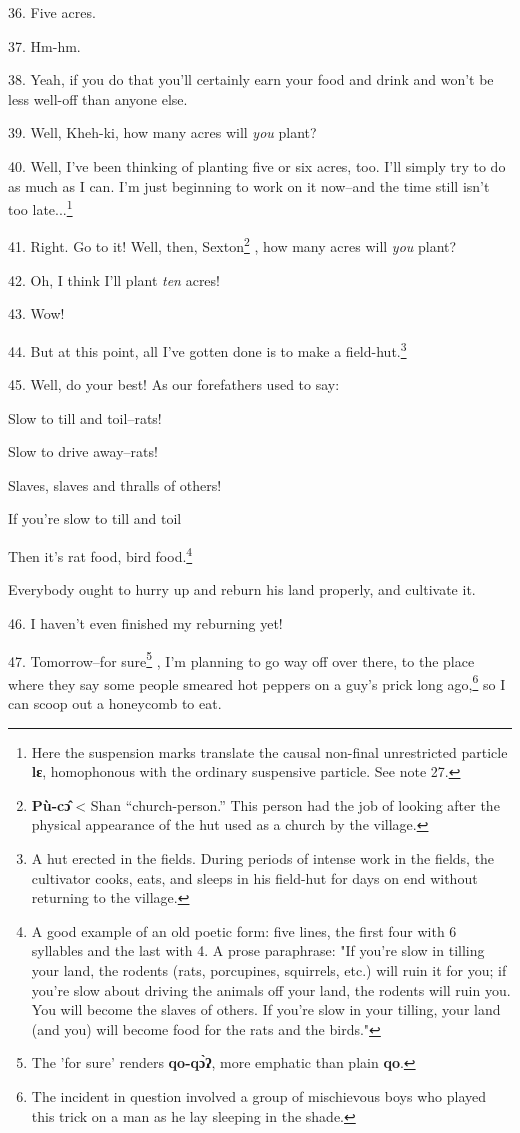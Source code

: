 36. Five acres.

37. Hm-hm.

38. Yeah, if you do that you'll certainly earn your food and drink and won't be
less well-off than anyone else.

39. Well, Kheh-ki, how many acres will \textit{you} plant?

40. Well, I've been thinking of planting five or six acres, too. I'll simply try
to do as much as I can. I'm just beginning to work on it now--and the time still
isn't too late...\footnote{Here the suspension marks translate the causal non-final unrestricted particle \textbf{lɛ}, homophonous with the ordinary suspensive particle. See note 27.}

41. Right. Go to it! Well, then, Sexton\footnote{\textbf{Pù-cɔ̂} < Shan ``church-person.'' This person had the job of looking after the physical appearance of the hut used as a church by the village.} , how many acres will \textit{you}
plant?

42. Oh, I think I'll plant \textit{ten} acres!

43. Wow!

44. But at this point, all I've gotten done is to make a field-hut.\footnote{A hut erected in the fields. During periods of intense work in the fields, the cultivator cooks, eats, and sleeps in his field-hut for days on end without returning to the village.}

45. Well, do your best! As our forefathers used to say:

Slow to till and toil--rats!

Slow to drive away--rats!

Slaves, slaves and thralls of others!

If you're slow to till and toil

Then it's rat food, bird food.\footnote{A good example of an old poetic form: five lines, the first four with 6 syllables and the last with 4. A prose paraphrase: "If you're slow in tilling your land, the rodents (rats, porcupines, squirrels, etc.) will ruin it for you; if you're slow about driving the animals off your land, the rodents will ruin you. You will become the slaves of others. If you're slow in your tilling, your land (and you) will become food for the rats and the birds."}

Everybody ought to hurry up and reburn his land properly, and cultivate it.

46. I haven't even finished my reburning yet!

47. Tomorrow--for sure\footnote{The 'for sure' renders \textbf{qo-qɔ̀ʔ}, more emphatic than plain \textbf{qo}.} , I'm planning to go way off over there, to the place
where they say some people smeared hot peppers on a guy's prick long ago,\footnote{The incident in question involved a group of mischievous boys who played this trick on a man as he lay sleeping in the shade.}
so I can scoop out a honeycomb to eat.

